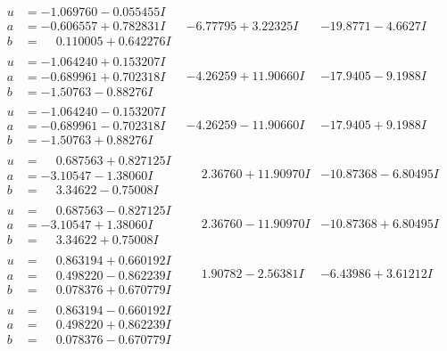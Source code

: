 \documentclass[1p]{elsarticle_modified}
\theoremstyle{definition}
\begin{document}
$$\begin{array}{c|c|c}
\begin{aligned}
u &= -1.069760 - 0.055455 I \\
a &= -0.606557 + 0.782831 I \\
b &= \phantom{-}0.110005 + 0.642276 I\end{aligned}
 & -6.77795 + 3.22325 I & -19.8771 - 4.6627 I \\ \hline\begin{aligned}
u &= -1.064240 + 0.153207 I \\
a &= -0.689961 + 0.702318 I \\
b &= -1.50763 - 0.88276 I\end{aligned}
 & -4.26259 + 11.90660 I & -17.9405 - 9.1988 I \\ \hline\begin{aligned}
u &= -1.064240 - 0.153207 I \\
a &= -0.689961 - 0.702318 I \\
b &= -1.50763 + 0.88276 I\end{aligned}
 & -4.26259 - 11.90660 I & -17.9405 + 9.1988 I \\ \hline\begin{aligned}
u &= \phantom{-}0.687563 + 0.827125 I \\
a &= -3.10547 - 1.38060 I \\
b &= \phantom{-}3.34622 - 0.75008 I\end{aligned}
 & \phantom{-}2.36760 + 11.90970 I & -10.87368 - 6.80495 I \\ \hline\begin{aligned}
u &= \phantom{-}0.687563 - 0.827125 I \\
a &= -3.10547 + 1.38060 I \\
b &= \phantom{-}3.34622 + 0.75008 I\end{aligned}
 & \phantom{-}2.36760 - 11.90970 I & -10.87368 + 6.80495 I \\ \hline\begin{aligned}
u &= \phantom{-}0.863194 + 0.660192 I \\
a &= \phantom{-}0.498220 - 0.862239 I \\
b &= \phantom{-}0.078376 + 0.670779 I\end{aligned}
 & \phantom{-}1.90782 - 2.56381 I & -6.43986 + 3.61212 I \\ \hline\begin{aligned}
u &= \phantom{-}0.863194 - 0.660192 I \\
a &= \phantom{-}0.498220 + 0.862239 I \\
b &= \phantom{-}0.078376 - 0.670779 I\end{aligned}

\end{array}$$
\end{document}
